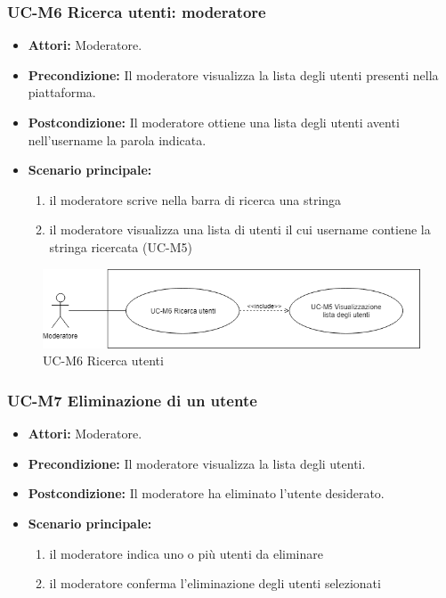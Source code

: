 \subsubsection{UC-M6 Ricerca utenti: moderatore}
	\begin{itemize}
		\item \textbf{Attori:} Moderatore.
		\item \textbf{Precondizione:} Il moderatore visualizza la lista degli utenti presenti nella piattaforma.
		\item \textbf{Postcondizione:} Il moderatore ottiene una lista degli utenti aventi nell'username la parola indicata.
		\item \textbf{Scenario principale:}
			\begin{enumerate}
				\item il moderatore scrive nella barra di ricerca una stringa
				\item il moderatore visualizza una lista di utenti il cui username contiene la stringa ricercata (UC-M5)
			\end{enumerate}
	\end{itemize}
	
	\begin{figure}[h]
		\centering
		\includegraphics[scale=0.7]{images/UC-M6.png}
		\caption{UC-M6 Ricerca utenti}
	\end{figure}	

\subsubsection{UC-M7 Eliminazione di un utente}
\begin{itemize}
	\item \textbf{Attori:} Moderatore.
	\item \textbf{Precondizione:} Il moderatore visualizza la lista degli utenti.
	\item \textbf{Postcondizione:} Il moderatore ha eliminato l'utente desiderato.
	\item \textbf{Scenario principale:}
	\begin{enumerate}
		\item il moderatore indica uno o più utenti da eliminare
		\item il moderatore conferma l'eliminazione degli utenti selezionati
	\end{enumerate}
\end{itemize}

